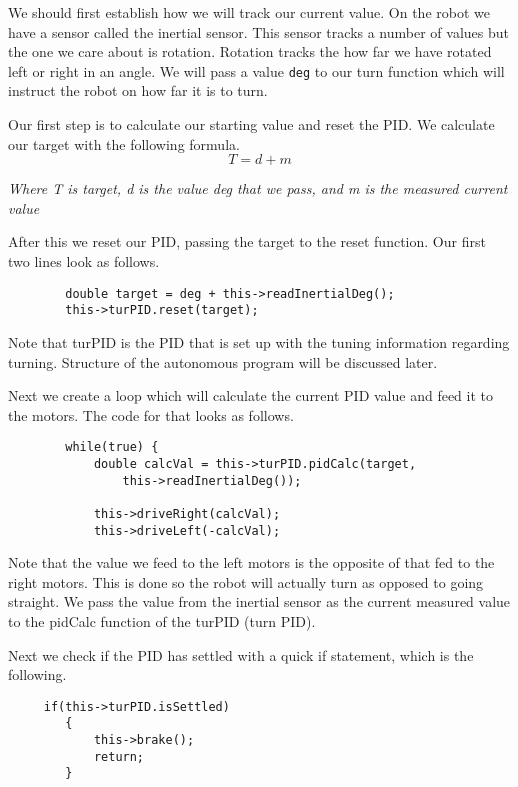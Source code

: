 \documentclass[12pt]{article}
\begin{document}
    We should first establish how we will track our current value. On the robot we have a sensor called the inertial sensor. This sensor tracks a number of values but the one we care about is rotation. Rotation tracks the how far we have rotated left or right in an angle. We will pass a value \verb|deg| to our turn function which will instruct the robot on how far it is to turn.

    Our first step is to calculate our starting value and reset the PID. We calculate our target with the following formula.
    $$ T = d + m $$
    \begin{center}
     \em{Where T is target, d is the value deg that we pass, and m is the measured current value}
    \end{center}

    After this we reset our PID, passing the target to the reset function. Our first two lines look as follows.

    \begin{verbatim}
        double target = deg + this->readInertialDeg();
        this->turPID.reset(target);
    \end{verbatim}

    Note that turPID is the PID that is set up with the tuning information regarding turning. Structure of the autonomous program will be discussed later.

    Next we create a loop which will calculate the current PID value and feed it to the motors. The code for that looks as follows.

    \begin{verbatim}
        while(true) {
            double calcVal = this->turPID.pidCalc(target,
                this->readInertialDeg());

            this->driveRight(calcVal);
            this->driveLeft(-calcVal);
    \end{verbatim}

    Note that the value we feed to the left motors is the opposite of that fed to the right motors. This is done so the robot will actually turn as opposed to going straight. We pass the value from the inertial sensor as the current measured value to the pidCalc function of the turPID (turn PID).

    Next we check if the PID has settled with a quick if statement, which is the following.
    \begin{verbatim}
     if(this->turPID.isSettled)
        {
            this->brake();
            return;
        }
    \end{verbatim}
\end{document}
